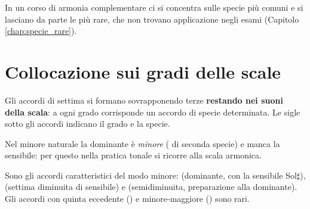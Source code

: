In un corso di armonia complementare ci si concentra sulle specie più comuni e si lasciano da parte le più rare, che non trovano applicazione negli esami (Capitolo \ref{chap:specie_rare}).

\section{Collocazione sui gradi delle scale}
\label{sec:collocazione_scale}

Gli accordi di settima si formano sovrapponendo terze \textbf{restando nei suoni della scala}: a ogni grado corrisponde un accordo di specie determinata. Le sigle sotto gli accordi indicano il grado e la specie.

\begin{esempio}
	\label{ex:scala_do}
\end{esempio}

\begin{esempio}
	\label{ex:scala_lan}
	Nel minore naturale la dominante è \emph{minore} ( di seconda specie) e manca la sensibile: per questo nella pratica tonale si ricorre alla scala armonica.
\end{esempio}

\begin{esempio}
	\label{ex:scala_la_arm}
	Sono gli accordi caratteristici del modo minore:  (dominante, con la sensibile Sol$\sharp$),  (settima diminuita di sensibile) e  (semidiminuita, preparazione alla dominante). Gli accordi con quinta eccedente () e minore-maggiore () sono rari.
\end{esempio}

\begin{esempio}
	\label{ex:scala_la_mel}
\end{esempio}

